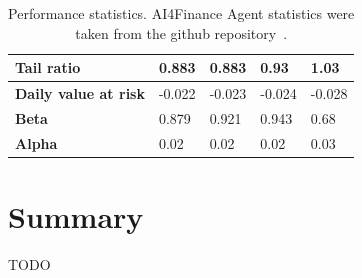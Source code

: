 \documentclass[../xlapes02]{subfiles}
\begin{document}
\begin{table}[!ht]
\begin{tabular}{|l|l|l|l|l|}
            \textbf{Tail ratio}          & 0.883                     & 0.883                     & 0.93         & 1.03                \\ \hline
            \textbf{Daily value at risk} & -0.022                    & -0.023                    & -0.024       & -0.028              \\ \hline
            \textbf{Beta}                & 0.879                     & 0.921                     & 0.943        & 0.68                \\ \hline
            \textbf{Alpha}               & 0.02                      & 0.02                      & 0.02         & 0.03                \\ \hline
        \end{tabular}
        \caption{Performance statistics. AI4Finance Agent statistics were taken from the github repository~\cite{FinRL-Tutorials}.}
    \end{table}


    \section{Summary}\label{sec:summary}
    TODO
\end{document}

